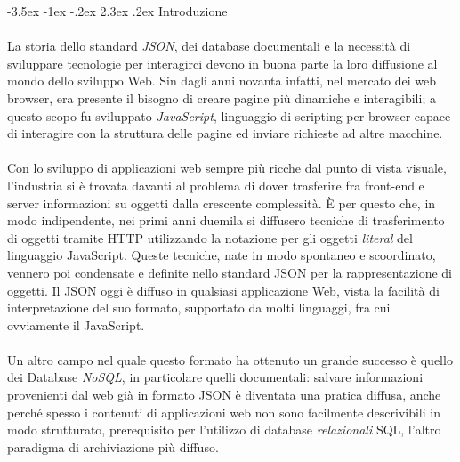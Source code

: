 \documentclass[a4paper, 12pt]{report}
\begin{document}

\graphicspath{ {./} }
\setlength{\parindent}{0em}
\setcounter{secnumdepth}{0}
\makeatletter
\renewcommand\section{\@startsection{section}{1}{\z@}%
                                   {-3.5ex \@plus -1ex \@minus -.2ex}%
                                   {2.3ex \@plus.2ex}%
                                   {\normalfont\large\bfseries\center}}
  \section{Introduzione}
    \paragraph*{}
      La storia dello standard \emph{JSON}, dei database documentali e la necessità di sviluppare tecnologie per interagirci devono in buona parte la loro diffusione al mondo dello sviluppo Web.
      Sin dagli anni novanta infatti, nel mercato dei web browser, era presente il bisogno di creare pagine più dinamiche e interagibili; a questo scopo fu sviluppato \emph{JavaScript}, linguaggio di scripting per browser capace di interagire con la struttura delle pagine ed inviare richieste ad altre macchine.
    \paragraph*{}
      Con lo sviluppo di applicazioni web sempre più ricche dal punto di vista visuale, l'industria si è trovata davanti al problema di dover trasferire fra front-end e server informazioni su oggetti dalla crescente complessità.
      È per questo che, in modo indipendente, nei primi anni duemila si diffusero tecniche di trasferimento di oggetti tramite HTTP utilizzando la notazione per gli oggetti \emph{literal} del linguaggio JavaScript.
      Queste tecniche, nate in modo spontaneo e scoordinato, vennero poi condensate e definite nello standard JSON per la rappresentazione di oggetti.
      Il JSON oggi è diffuso in qualsiasi applicazione Web, vista la facilità di interpretazione del suo formato, supportato da molti linguaggi, fra cui ovviamente il JavaScript.
      \paragraph*{}
      Un altro campo nel quale questo formato ha ottenuto un grande successo è quello dei Database \emph{NoSQL}, in particolare quelli documentali: salvare informazioni provenienti dal web già in formato JSON è diventata una pratica diffusa, anche perché spesso i contenuti di applicazioni web non sono facilmente descrivibili in modo strutturato, prerequisito per l'utilizzo di database \emph{relazionali} SQL, l'altro paradigma di archiviazione più diffuso.
\end{document}
